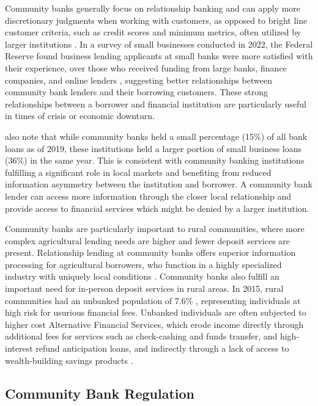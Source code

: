 \documentclass[12pt]{article}
\begin{document}
Community banks generally focus on relationship banking and can apply more discretionary judgments when working with customers, as opposed to bright line customer criteria, such as credit scores and minimum metrics, often utilized by larger institutions \citep{ICBA2024}. In a survey of small businesses conducted in 2022, the Federal Reserve found business lending applicants at small banks were more satisfied with their experience, over those who received funding from large banks, finance companies, and online lenders \citep{FRB2023}, suggesting better relationships between community bank lenders and their borrowing customers. These strong relationships between a borrower and financial institution are particularly useful in times of crisis or economic downturn.

\citet{KandracMarsh2025} also note that while community banks held a small percentage (15\%) of all bank loans as of 2019, these institutions held a larger portion of small business loans (36\%) in the same year. This is consistent with community banking institutions fulfilling a significant role in local markets and benefiting from reduced information asymmetry between the institution and borrower. A community bank lender can access more information through the closer local relationship and provide access to financial services which might be denied by a larger institution.

Community banks are particularly important to rural communities, where more complex agricultural lending needs are higher and fewer deposit services are present. Relationship lending at community banks offers superior information processing for agricultural borrowers, who function in a highly specialized industry with uniquely local conditions \citep{KandracMarsh2025}. Community banks also fulfill an important need for in-person deposit services in rural areas. In 2015, rural communities had an unbanked population of 7.6\% \citep{HayashiMinhas2018}, representing individuals at high risk for usurious financial fees. Unbanked individuals are often subjected to higher cost Alternative Financial Services, which erode income directly through additional fees for services such as check-cashing and funds transfer, and high-interest refund anticipation loans, and indirectly through a lack of access to wealth-building savings products \citep{Barr2004}.

\subsection{Community Bank Regulation}
\end{document}
